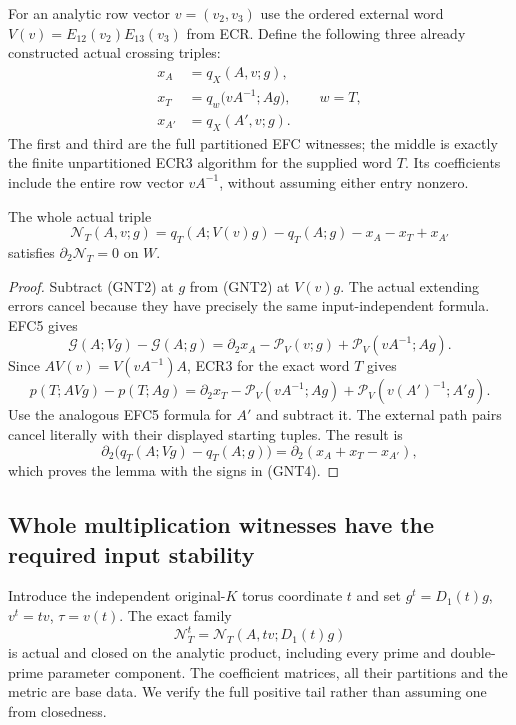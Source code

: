 For an analytic row vector $v=(v_2,v_3)$ use the ordered external
word $V(v)=E_{12}(v_2)E_{13}(v_3)$ from ECR.  Define the following
three already constructed actual crossing triples:
\[
 \begin{split}
 x_A&=q_X(A,v;g),\\
 x_T&=q_w\bigl(vA^{-1};Ag\bigr),\qquad w=T,\\
 x_{A'}&=q_X(A',v;g).
 \end{split}
 \tag{GNT3}
\]
The first and third are the full partitioned EFC witnesses; the
middle is exactly the finite unpartitioned ECR3 algorithm for
the supplied word $T$.  Its coefficients include the entire row
vector $vA^{-1}$, without assuming either entry nonzero.

\begin{lemma}
The whole actual triple
\[
 \mathcal N_T(A,v;g)
   =q_T(A;V(v)g)-q_T(A;g)-x_A-x_T+x_{A'}
 \tag{GNT4}
\]
satisfies $\partial_2\mathcal N_T=0$ on $W$.
\end{lemma}

\begin{proof}
Subtract (GNT2) at $g$ from (GNT2) at $V(v)g$.
The actual extending errors cancel because they have precisely
the same input-independent formula.  EFC5 gives
\[
 \mathcal G(A;Vg)-\mathcal G(A;g)
  =\partial_2x_A-\mathcal P_V(v;g)
                         +\mathcal P_V(vA^{-1};Ag).
 \tag{GNT5}
\]
Since $AV(v)=V(vA^{-1})A$, ECR3 for the exact word $T$ gives
\[
 p(T;AVg)-p(T;Ag)
  =\partial_2x_T-\mathcal P_V(vA^{-1};Ag)
                         +\mathcal P_V(v(A')^{-1};A'g).
 \tag{GNT6}
\]
Use the analogous EFC5 formula for $A'$ and subtract it.
The external path pairs cancel literally with their displayed
starting tuples.  The result is
\[
 \partial_2\bigl(q_T(A;Vg)-q_T(A;g)\bigr)
                    =\partial_2(x_A+x_T-x_{A'}),
\]
which proves the lemma with the signs in (GNT4).
\end{proof}

\subsection{Whole multiplication witnesses have the required input stability}

Introduce the independent original-$K$ torus coordinate $t$ and
set $g^t=D_1(t)g$, $v^t=tv$, $\tau=v(t)$.  The exact family
\[
              \mathcal N_T^t=\mathcal N_T(A,tv;D_1(t)g)
 \tag{GNT7}
\]
is actual and closed on the analytic product, including every
prime and double-prime parameter component.  The coefficient
matrices, all their partitions and the metric are base data.
We verify the full positive tail rather than assuming one from
closedness.

